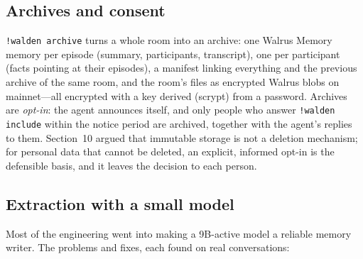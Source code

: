 \documentclass[11pt]{article}
\begin{document}
\subsection{Archives and consent}

\texttt{!walden archive} turns a whole room into an archive: one Walrus Memory memory per episode (summary, participants, transcript), one per participant (facts pointing at their episodes), a manifest linking everything and the previous archive of the same room, and the room's files as encrypted Walrus blobs on mainnet---all encrypted with a key derived (scrypt) from a password. Archives are \emph{opt-in}: the agent announces itself, and only people who answer \texttt{!walden include} within the notice period are archived, together with the agent's replies to them. Section~10 argued that immutable storage is not a deletion mechanism; for personal data that cannot be deleted, an explicit, informed opt-in is the defensible basis, and it leaves the decision to each person.

\subsection{Extraction with a small model}

Most of the engineering went into making a 9B-active model a reliable memory writer. The problems and fixes, each found on real conversations:
\end{document}
